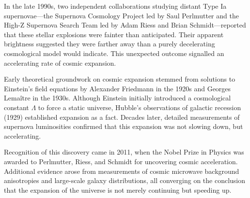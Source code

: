 \begin{historical}
In the late 1990s, two independent collaborations studying distant Type Ia supernovae—the Supernova Cosmology Project led by Saul Perlmutter and the High-Z Supernova Search Team led by Adam Riess and Brian Schmidt—reported that these stellar explosions were fainter than anticipated. Their apparent brightness suggested they were farther away than a purely decelerating cosmological model would indicate. This unexpected outcome signalled an accelerating rate of cosmic expansion. 

Early theoretical groundwork on cosmic expansion stemmed from solutions to Einstein’s field equations by Alexander Friedmann in the 1920s and Georges Lemaître in the 1930s. Although Einstein initially introduced a cosmological constant $\Lambda$ to force a static universe, Hubble’s observations of galactic recession (1929) established expansion as a fact. Decades later, detailed measurements of supernova luminosities confirmed that this expansion was not slowing down, but accelerating.

Recognition of this discovery came in 2011, when the Nobel Prize in Physics was awarded to Perlmutter, Riess, and Schmidt for uncovering cosmic acceleration. Additional evidence arose from measurements of cosmic microwave background anisotropies and large-scale galaxy distributions, all converging on the conclusion that the expansion of the universe is not merely continuing but speeding up.
\end{historical}
